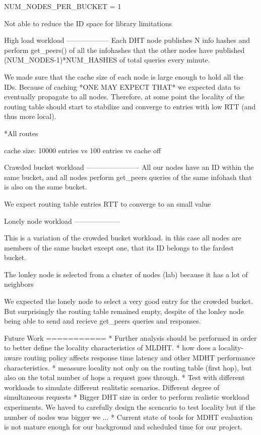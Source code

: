 NUM_NODES_PER_BUCKET = 1

Not able to reduce the ID space for library limitations

High load workload
------------------
Each DHT node publishes N info hashes and perform get_peers() of all the infohashes that the other nodes have published (NUM_NODES-1)*NUM_HASHES of total queries every minute.

We made sure that the cache size of each node is large enough to hold all the IDs. Because of caching *ONE MAY EXPECT THAT* we expected data to eventually propagate to all nodes. Therefore, at some point the locality of the routing table should start to stabilize and converge to entries with low RTT (and thus more local).

*All routes

cache size: 10000 entries vs 100 entries vs cache off


Crawded bucket workload
-----------------------
All our nodes have an ID within the same bucket, and all nodes perform get_peers queries of the same infohash that is also on the same bucket.

We expect routing table entries RTT to converge to an small value

Lonely node workload
--------------------

This is a variation of the crowded bucket workload. in this case all nodes are members of the same bucket except one, that its ID belongs to the fardest bucket.

The lonley node is selected from a cluster of nodes (lab) because it has a lot of neighbors 

We expected the lonely node to select a very good entry for the crowded bucket. But surprisingly the routing table remained empty, despite of the lonley node being able to send and recieve get_peers queries and responses.


Future Work
===========
* Further analysis should be performed in order to better define the locality characteristics of MLDHT.
* how does a locality-aware routing policy affects response time latency and other MDHT performance characteristics.
* meassure locality not only on the routing table (first hop), but also on the total number of hops a request goes through.
* Test with different workloads to simulate different realitstic scenarios. Different degree of simultaneous requests
* Bigger DHT size in order to perform realistic workload experiments. We haved to carefully design the scencario to test locality but if the number of nodes was bigger we ...
* Current state of tools for MDHT evaluation is not mature enough for our background and scheduled time for our project.

